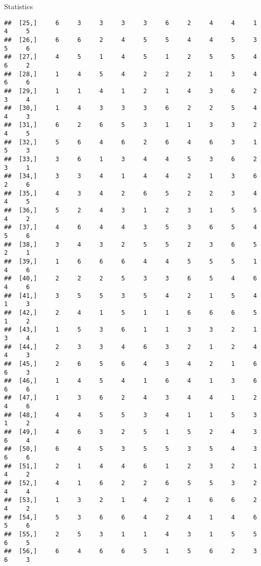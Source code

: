 \documentclass[
  ignorenonframetext,
]{beamer}
\begin{document}
\begin{frame}[fragile]{Statistics}
\begin{verbatim}
##  [25,]     6     3     3     3     3     6     2     4     4     1     4     5
##  [26,]     6     6     2     4     5     5     4     4     5     3     5     6
##  [27,]     4     5     1     4     5     1     2     5     5     4     6     2
##  [28,]     1     4     5     4     2     2     2     1     3     4     6     6
##  [29,]     1     1     4     1     2     1     4     3     6     2     3     4
##  [30,]     1     4     3     3     3     6     2     2     5     4     4     3
##  [31,]     6     2     6     5     3     1     1     3     3     2     4     5
##  [32,]     5     6     4     6     2     6     4     6     3     1     5     3
##  [33,]     3     6     1     3     4     4     5     3     6     2     3     1
##  [34,]     3     3     4     1     4     4     2     1     3     6     2     6
##  [35,]     4     3     4     2     6     5     2     2     3     4     4     5
##  [36,]     5     2     4     3     1     2     3     1     5     5     4     2
##  [37,]     4     6     4     4     3     5     3     6     5     4     5     6
##  [38,]     3     4     3     2     5     5     2     3     6     5     2     1
##  [39,]     1     6     6     6     4     4     5     5     5     1     4     6
##  [40,]     2     2     2     5     3     3     6     5     4     6     4     6
##  [41,]     3     5     5     3     5     4     2     1     5     4     1     3
##  [42,]     2     4     1     5     1     1     6     6     6     5     1     2
##  [43,]     1     5     3     6     1     1     3     3     2     1     3     4
##  [44,]     2     3     3     4     6     3     2     1     2     4     4     3
##  [45,]     2     6     5     6     4     3     4     2     1     6     6     3
##  [46,]     1     4     5     4     1     6     4     1     3     6     6     6
##  [47,]     1     3     6     2     4     3     4     4     1     2     4     6
##  [48,]     4     4     5     5     3     4     1     1     5     3     1     2
##  [49,]     4     6     3     2     5     1     5     2     4     3     6     4
##  [50,]     6     4     5     3     5     5     3     5     4     3     6     6
##  [51,]     2     1     4     4     6     1     2     3     2     1     4     2
##  [52,]     4     1     6     2     2     6     5     5     3     2     4     4
##  [53,]     1     3     2     1     4     2     1     6     6     2     4     2
##  [54,]     5     3     6     6     4     2     4     1     4     6     5     6
##  [55,]     2     5     3     1     1     4     3     1     5     5     6     5
##  [56,]     6     4     6     6     5     1     5     6     2     3     6     3

\end{verbatim}
\end{frame}
\end{document}
